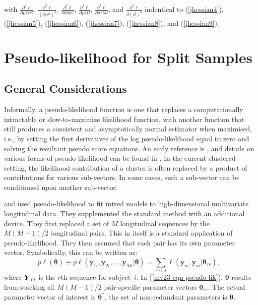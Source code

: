 \documentclass[11pt,a5paper,twoside]{book}
\newcommand{\BY}{\mbox{\boldmath $Y$}}
\begin{document}
{with $\frac{\partial^2\ell}{\partial \mu \partial \sigma^2}$, $\frac{\partial^2\ell}{(\partial \sigma^2)^2}$, $\frac{\partial^2\ell}{\partial d \partial \sigma^2}$, $\frac{\partial^2\ell}{\partial \mu \partial d}$, $\frac{\partial^2\ell}{\partial \sigma^2 \partial d}$, and $\frac{\partial^2\ell}{\partial (d)^2}$ indentical to (\ref{jhessian4}),
(\ref{jhessian5}), (\ref{jhessian6}), (\ref{jhessian7}), (\ref{jhessian8}), and (\ref{jhessian9}).

\section{Pseudo-likelihood for Split Samples}
\label{splitsample}

\subsection{General Considerations}
Informally, a pseudo-likelihood function is one that replaces a computationally intractable or slow-to-maximize likelihood function, with another function that still produces a consistent and asymptotically normal estimator when maximised, i.e., by setting the first derivatives of the log pseudo-likelihood equal to zero and solving the resultant pseudo score equations. An early reference is \cite{arnold1991}, and details on various forms of pseudo-likelihood can be found in \cite[Ch.~9, 12, 21, 22, 24, and 25]{molenberghs2005}. In the current clustered setting, the likelihood contribution of a cluster is often replaced by a product of contributions for various sub-vectors. In some cases, such a sub-vector can be conditioned upon another sub-vector.

\cite{Verbeke2006} and \cite{Fetal06} used pseudo-likelihood to fit mixed models to high-dimensional multivariate longitudinal data. They supplemented the standard method with an additional device. They first replaced a set of $M$ longitudinal sequences by the $M(M-1)/2$ longitudinal pairs. This in itself is a standard application of pseudo-likelihood. They then assumed that each pair has its own parameter vector.
Symbolically, this can be written as:
\begin{equation}
p\ell({\bm{\theta}})  \equiv  p\ell(\mathbf{y}_{1i}, \mathbf{y}_{2i}, \ldots, \mathbf{y}_{Mi} |{\bm{\theta}})
 =  \sum_{r<s} \ell(\mathbf{y}_{ri}, \mathbf{y}_{si} | \bm{\theta}_{rs}), \label{mv23 eqn pseudo lik}
\end{equation}
where $\BY_{ri}$ is the $r$th sequence for subject~$i$. In (\ref{mv23 eqn pseudo lik}), $\bm{\theta}$ results from stacking all $M(M-1)/2$ pair-specific parameter vectors $\bm{\theta}_{rs}$. The actual parameter vector of interest is  $\bm{\theta}^*$, the set of non-redundant parameters is $\bm{\theta}$.

}
\end{document}
